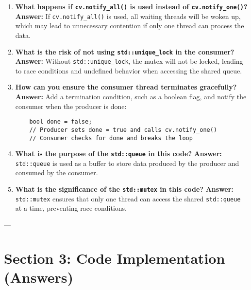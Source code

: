 \documentclass[12pt]{article}
\begin{document}
\begin{enumerate}
    \item \textbf{What happens if \texttt{cv.notify\_all()} is used instead of \texttt{cv.notify\_one()}?}
    \textbf{Answer:} If \texttt{cv.notify\_all()} is used, all waiting threads will be woken up, which may lead to unnecessary contention if only one thread can process the data.

    \item \textbf{What is the risk of not using \texttt{std::unique\_lock} in the consumer?}
    \textbf{Answer:} Without \texttt{std::unique\_lock}, the mutex will not be locked, leading to race conditions and undefined behavior when accessing the shared queue.

    \item \textbf{How can you ensure the consumer thread terminates gracefully?}
    \textbf{Answer:} Add a termination condition, such as a boolean flag, and notify the consumer when the producer is done:
    \begin{verbatim}
    bool done = false;
    // Producer sets done = true and calls cv.notify_one()
    // Consumer checks for done and breaks the loop
    \end{verbatim}

    \item \textbf{What is the purpose of the \texttt{std::queue} in this code?}
    \textbf{Answer:} \texttt{std::queue} is used as a buffer to store data produced by the producer and consumed by the consumer.

    \item \textbf{What is the significance of the \texttt{std::mutex} in this code?}
    \textbf{Answer:} \texttt{std::mutex} ensures that only one thread can access the shared \texttt{std::queue} at a time, preventing race conditions.
\end{enumerate}

---

\section*{Section 3: Code Implementation (Answers)}
\end{document}

